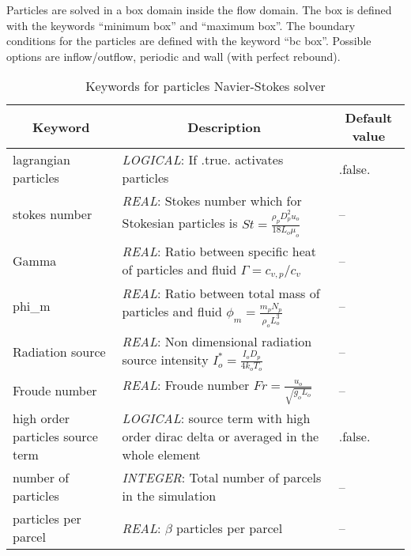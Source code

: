 \documentclass[a4paper,10pt]{report}
\begin{document}
Particles are solved in a box domain inside the flow domain. The box is defined with the keywords ``minimum box'' and ``maximum box''. The boundary conditions for the particles are defined with the keyword ``bc box''. Possible options are inflow/outflow, periodic and wall (with perfect rebound). 

\begin{table}[htbp]
    \caption{Keywords for particles Navier-Stokes solver}
    \begin{tabular}{|l|p{10cm}|p{2.2cm}|}
    \hline
    \multicolumn{1}{|c|}{Keyword} & \multicolumn{1}{c|}{Description} & \multicolumn{1}{c|}{Default value} \\ \hline
    lagrangian particles                & \textit{LOGICAL}: If .true. activates particles & .false. \\ \hline
    stokes number                       & \textit{REAL}: Stokes number which for Stokesian particles is $St=\frac{\rho_p D_p^2 u_o}{18 L_o \mu_o}$  & -- \\ \hline
    Gamma                               & \textit{REAL}: Ratio between specific heat of particles and fluid $\Gamma=c_{v,p}/c_{v}$ & -- \\ \hline
    phi\_m                               & \textit{REAL}: Ratio between total mass of particles and fluid $\phi_m=\frac{m_p N_p}{\rho_o L_o^3}$  & -- \\ \hline
    Radiation source                    & \textit{REAL}: Non dimensional radiation source intensity $I_o^*=\frac{I_o D_p}{4k_oT_o}$   & -- \\ \hline
    Froude number                       & \textit{REAL}: Froude number $Fr=\frac{u_o}{\sqrt{g_o L_o}}$  & -- \\ \hline
    high order particles source term    & \textit{LOGICAL}: source term with high order dirac delta or averaged in the whole element  & .false. \\ \hline
    number of particles                 & \textit{INTEGER}: Total number of parcels in the simulation & -- \\ \hline
    particles per parcel                & \textit{REAL}: $\beta$ particles per parcel & -- \\ \hline

    \end{tabular}
    \label{tab:PartKey1}
    \end{table}
\end{document}
